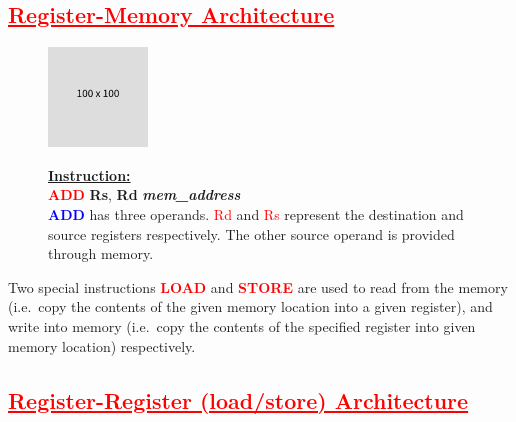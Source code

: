 \documentclass[
  14pt,
  a4paper,
  DIV=11,
  numbers=noendperiod,
  headinclude=true,
  footinclude=true]{scrreprt}
\begin{document}
\subsection{\texorpdfstring{\textcolor{red}{\underline{Register-Memory Architecture}}}{}}\label{section-2}

\begin{figure}[H]

\begin{minipage}{0.40\linewidth}

\includegraphics{index_files/mediabag/FiKGhYhhIWJYiBgWIoaF.png}\end{minipage}%
%
\begin{minipage}{0.60\linewidth}

\begin{tcolorbox}[colback=boxbodycol, colframe=boxbodycol]
\textbf{\underline{Instruction:}}\\
\textcolor{red}{\textbf{ADD}} \textbf{Rs}, \textbf{Rd}
\textbf{\emph{mem\_address}}\\
\textcolor{blue}{\textbf{ADD}} has three operands. \textcolor{red}{Rd}
and \textcolor{red}{Rs} represent the destination and source registers
respectively. The other source operand is provided through memory.

\end{tcolorbox}

\end{minipage}%

\end{figure}%

\begin{tcolorbox}[colback=boxbodycol, colframe=boxbodycol]
Two special instructions \textcolor{red}{\textbf{LOAD}} and
\textcolor{red}{\textbf{STORE}} are used to read from the memory
(i.e.~copy the contents of the given memory location into a given
register), and write into memory (i.e.~copy the contents of the
specified register into given memory location) respectively.

\end{tcolorbox}

\subsection{\texorpdfstring{\textcolor{red}{\underline{Register-Register (load/store) Architecture}}}{}}\label{section-3}
\end{document}
